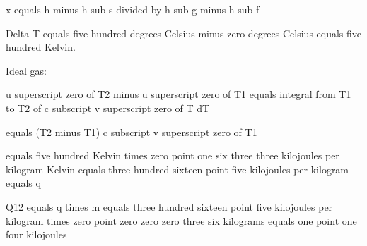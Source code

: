 x equals h minus h sub s divided by h sub g minus h sub f

Delta T equals five hundred degrees Celsius minus zero degrees Celsius equals five hundred Kelvin.

Ideal gas:

u superscript zero of T2 minus u superscript zero of T1 equals integral from T1 to T2 of c subscript v superscript zero of T dT

equals (T2 minus T1) c subscript v superscript zero of T1

equals five hundred Kelvin times zero point one six three three kilojoules per kilogram Kelvin equals three hundred sixteen point five kilojoules per kilogram equals q

Q12 equals q times m equals three hundred sixteen point five kilojoules per kilogram times zero point zero zero zero three six kilograms equals one point one four kilojoules